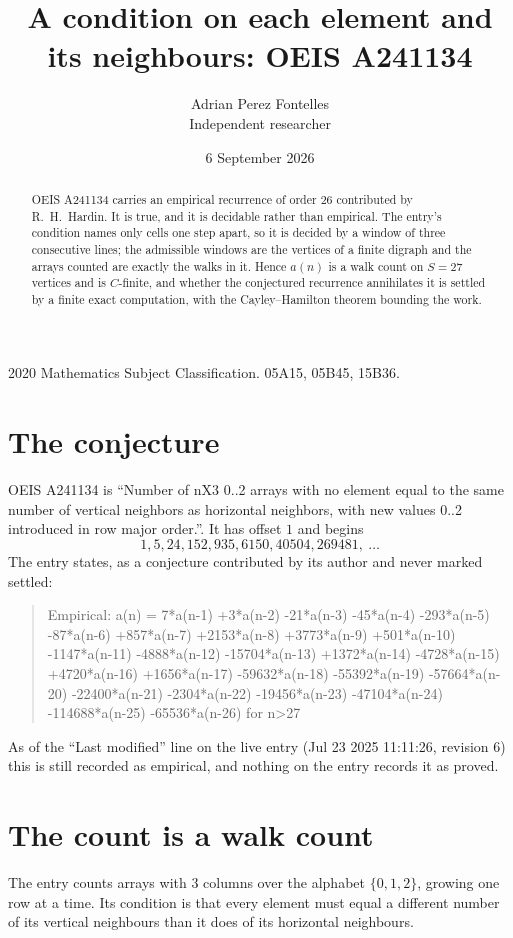 \documentclass[11pt,a4paper]{article}
\title{A condition on each element and its neighbours: OEIS A241134}
\author{Adrian Perez Fontelles\\ \small Independent researcher}
\date{6 September 2026}
\theoremstyle{plain}
\theoremstyle{definition}
\begin{document}
\maketitle

\begin{abstract}
OEIS A241134 carries an empirical recurrence of order $26$ contributed by R.~H.~Hardin. It is
true, and it is decidable rather than empirical. The entry's condition names only cells one step apart, so it is decided by a window of
three consecutive lines; the
admissible windows are the vertices of a finite digraph and the arrays counted are exactly the
walks in it. Hence $a(n)$ is a walk count on $S=27$ vertices and is $C$-finite, and whether the
conjectured recurrence annihilates it is settled by a finite exact computation, with the
Cayley--Hamilton theorem bounding the work.
\end{abstract}

\noindent\small 2020 Mathematics Subject Classification. 05A15, 05B45, 15B36.\normalsize

\section{The conjecture}

OEIS A241134 is ``Number of nX3 0..2 arrays with no element equal to the same number of vertical neighbors as horizontal neighbors, with new values 0..2 introduced in row major order.''. It has offset $1$ and begins
\[
1, 5, 24, 152, 935, 6150, 40504, 269481,\ \dots
\]
The entry states, as a conjecture contributed by its author and never marked settled:
\begin{quote}
Empirical: a(n) = 7*a(n-1) +3*a(n-2) -21*a(n-3) -45*a(n-4) -293*a(n-5) -87*a(n-6) +857*a(n-7) +2153*a(n-8) +3773*a(n-9) +501*a(n-10) -1147*a(n-11) -4888*a(n-12) -15704*a(n-13) +1372*a(n-14) -4728*a(n-15) +4720*a(n-16) +1656*a(n-17) -59632*a(n-18) -55392*a(n-19) -57664*a(n-20) -22400*a(n-21) -2304*a(n-22) -19456*a(n-23) -47104*a(n-24) -114688*a(n-25) -65536*a(n-26) for n>27
\end{quote}
As of the ``Last modified'' line on the live entry (Jul 23 2025 11:11:26, revision 6) this is still
recorded as empirical, and nothing on the entry records it as proved.

\section{The count is a walk count}

The entry counts arrays with $3$ columns over the alphabet $\{0,1,2\}$, growing one row at a time. Its condition is that every element must equal a different number of its vertical neighbours than it does of its horizontal neighbours.
\end{document}
